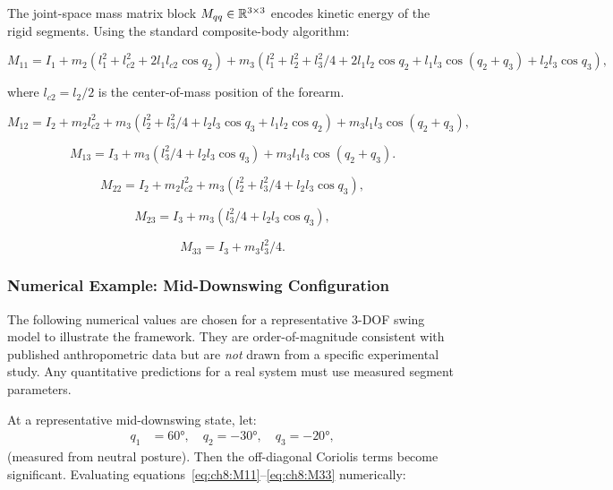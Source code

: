 The joint-space mass matrix block $M_{qq} \in \mathbb{R}^{3\times 3}$ encodes kinetic energy of
the rigid segments. Using the standard composite-body algorithm:

\begin{equation}
M_{11} = I_1 + m_2(l_1^2 + l_{c2}^2 + 2l_1 l_{c2}\cos q_2) + m_3(l_1^2 + l_2^2 + l_3^2/4
+ 2l_1 l_2 \cos q_2 + l_1 l_3 \cos(q_2+q_3) + l_2 l_3 \cos q_3),
\label{eq:ch8:M11}
\end{equation}

where $l_{c2} = l_2/2$ is the center-of-mass position of the forearm.

\begin{equation}
M_{12} = I_2 + m_2 l_{c2}^2 + m_3(l_2^2 + l_3^2/4 + l_2 l_3 \cos q_3 + l_1 l_2 \cos q_2)
+ m_3 l_1 l_3 \cos(q_2+q_3),
\label{eq:ch8:M12}
\end{equation}

\begin{equation}
M_{13} = I_3 + m_3(l_3^2/4 + l_2 l_3 \cos q_3) + m_3 l_1 l_3 \cos(q_2+q_3).
\label{eq:ch8:M13}
\end{equation}

\begin{equation}
M_{22} = I_2 + m_2 l_{c2}^2 + m_3(l_2^2 + l_3^2/4 + l_2 l_3 \cos q_3),
\label{eq:ch8:M22}
\end{equation}

\begin{equation}
M_{23} = I_3 + m_3(l_3^2/4 + l_2 l_3 \cos q_3),
\label{eq:ch8:M23}
\end{equation}

\begin{equation}
M_{33} = I_3 + m_3 l_3^2/4.
\label{eq:ch8:M33}
\end{equation}

\subsubsection{Numerical Example: Mid-Downswing Configuration}

\begin{warningbox}
The following numerical values are chosen for a representative 3-DOF swing model to
illustrate the framework. They are order-of-magnitude consistent with published
anthropometric data but are \emph{not} drawn from a specific experimental study.
Any quantitative predictions for a real system must use measured segment parameters.
\end{warningbox}

At a representative mid-downswing state, let:
\begin{align}
q_1 &= 60°, \quad q_2 = -30°, \quad q_3 = -20°,
\end{align}
(measured from neutral posture). Then the off-diagonal Coriolis terms become significant.
Evaluating equations~\eqref{eq:ch8:M11}--\eqref{eq:ch8:M33} numerically:

